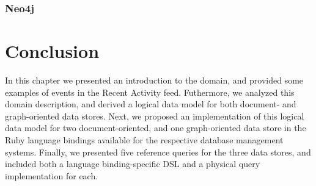 \subsubsection*{Neo4j}


\section{Conclusion}
\label{sec:data-model-conclusion}

In this chapter we presented an introduction to the domain, and provided some examples of events in the Recent Activity feed.
Futhermore, we analyzed this domain description, and derived a logical data model for both document- and graph-oriented data stores.
Next, we proposed an implementation of this logical data model for two document-oriented, and one graph-oriented data store in the Ruby language bindings available for the respective database management systems.
Finally, we presented five reference queries for the three data stores, and included both a language binding-specific DSL and a physical query implementation for each.

